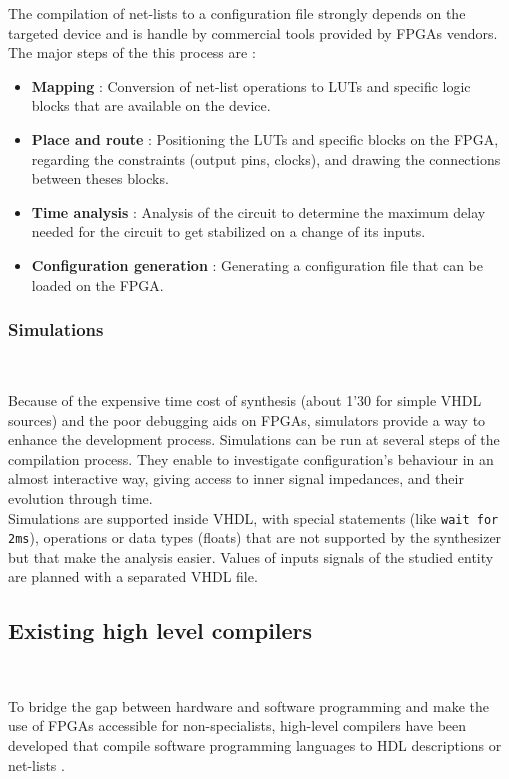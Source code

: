 \documentclass[10pt,a4paper]{article}
\newcommand{\code}{\texttt}
\renewcommand{\indent}{~\\\vspace{-.8cm}}
\begin{document}
The compilation of net-lists to a configuration file strongly depends on the targeted device and is handle by commercial tools provided by FPGAs vendors.  The major steps of the this process are :

\begin{itemize}
	\item \textbf{Mapping} : Conversion of net-list operations to LUTs and specific logic blocks that are available on the device.
	\item \textbf{Place and route} : Positioning the LUTs and specific blocks on the FPGA, regarding the constraints (output pins, clocks), and drawing the connections between theses blocks.
	\item \textbf{Time analysis} : Analysis of the circuit to determine the maximum delay needed for the circuit to get stabilized on a change of its inputs.
	\item \textbf{Configuration generation} : Generating a configuration file that can be loaded on the FPGA.
\end{itemize}


\subsubsection{Simulations} \indent

Because of the expensive time cost of synthesis (about 1'30 for simple VHDL sources) and the poor debugging aids on FPGAs, simulators provide a way to enhance the development process. Simulations can be run at several steps of the compilation process.
They enable to investigate configuration's behaviour in an almost interactive way, giving access to inner signal impedances, and their evolution through time.\\

Simulations are supported inside VHDL, with special statements (like \code{wait for 2ms}), operations or data types (floats) that are not supported by the synthesizer but that make the analysis easier. Values of inputs signals of the studied entity are planned with a separated VHDL file.





\subsection{Existing high level compilers} \indent

To bridge the gap between hardware and software programming and make the use of FPGAs accessible for non-specialists, high-level compilers have been developed that compile software programming languages to HDL descriptions \cite{bacon2013fpga} or net-lists \cite{iseli1995c++}.
\end{document}

